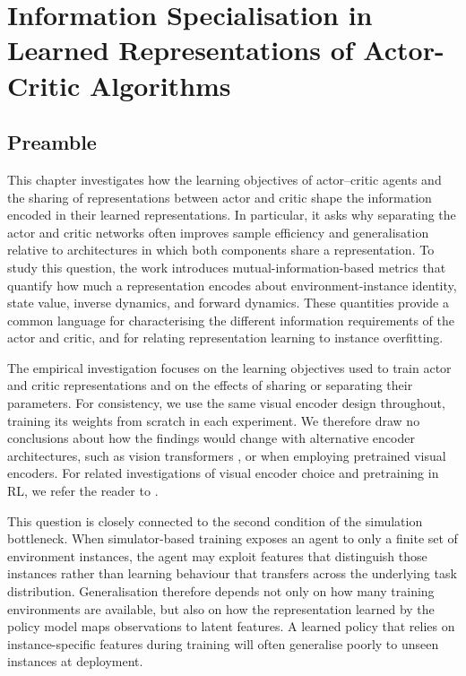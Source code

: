 \chapter{Information Specialisation in Learned Representations of Actor-Critic Algorithms}
\label{chap:deac}

\section{Preamble}

This chapter investigates how the learning objectives of actor--critic agents and the sharing of representations between actor and critic shape the information encoded in their learned representations. In particular, it asks why separating the actor and critic networks often improves sample efficiency and generalisation relative to architectures in which both components share a representation. To study this question, the work introduces mutual-information-based metrics that quantify how much a representation encodes about environment-instance identity, state value, inverse dynamics, and forward dynamics. These quantities provide a common language for characterising the different information requirements of the actor and critic, and for relating representation learning to instance overfitting.

The empirical investigation focuses on the learning objectives used to train actor and critic representations and on the effects of sharing or separating their parameters. For consistency, we use the same visual encoder design throughout, training its weights from scratch in each experiment. We therefore draw no conclusions about how the findings would change with alternative encoder architectures, such as vision transformers \citep{dosovitskiy2020image}, or when employing pretrained visual encoders. For related investigations of visual encoder choice and pretraining in RL, we refer the reader to \citet{yuan2022pretrained,williams2025pretrained}.

This question is closely connected to the second condition of the simulation bottleneck. When simulator-based training exposes an agent to only a finite set of environment instances, the agent may exploit features that distinguish those instances rather than learning behaviour that transfers across the underlying task distribution. Generalisation therefore depends not only on how many training environments are available, but also on how the representation learned by the policy model maps observations to latent features. A learned policy that relies on instance-specific features during training will often generalise poorly to unseen instances at deployment.

